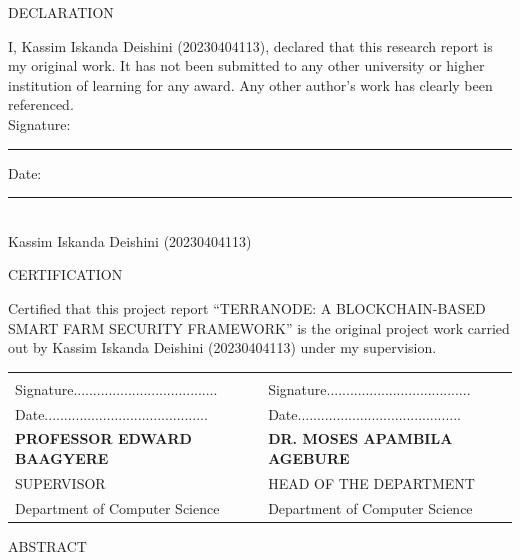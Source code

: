 \documentclass[12pt,a4paper]{report}
\begin{document}

\newpage
\begin{center}
    {\normalsize DECLARATION}
\end{center}
\vspace{1cm}
I, Kassim Iskanda Deishini (20230404113), declared that this research report is my original work. It has not been submitted to any other university or higher institution of learning for any award. Any other author's work has clearly been referenced.
\vspace{2cm}\\
\noindent Signature: \rule{5cm}{0.4pt} \hfill Date: \rule{4cm}{0.4pt}\\
\noindent Kassim Iskanda Deishini (20230404113)

\newpage
\begin{center}
    {\normalsize CERTIFICATION}
\end{center}
\vspace{1cm}
Certified that this project report ``TERRANODE: A BLOCKCHAIN-BASED SMART FARM SECURITY FRAMEWORK'' is the original project work carried out by Kassim Iskanda Deishini (20230404113) under my supervision.

\vspace{1.5cm}

\noindent
\begin{tabular}{@{}p{}p{}@{}}
 & \\[0.5cm]
Signature..................................... & Signature..................................... \\[0.5cm]
Date.......................................... & Date.......................................... \\[0.8cm]
\textbf{PROFESSOR EDWARD BAAGYERE} & \textbf{DR. MOSES APAMBILA AGEBURE} \\
SUPERVISOR & HEAD OF THE DEPARTMENT \\[0.5cm]
Department of Computer Science & Department of Computer Science \\
\end{tabular}

\newpage
\begin{center}
    {\normalsize ABSTRACT}
\end{center}
\vspace{1cm}
\doublespacing
\end{document}
